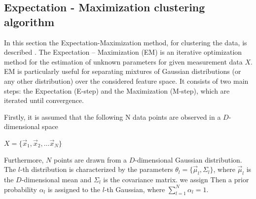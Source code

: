 \documentclass[11pt]{article}
\begin{document}
\subsection{Expectation - Maximization clustering algorithm}
In this section the Expectation-Maximization  method, for clustering the data, is described \cite{sundberg1974maximum,dempster1977maximum}. 
The Expectation – Maximization (EM) is an iterative optimization method for the estimation of unknown parameters for given measurement data $X$. EM is particularly useful for separating mixtures of Gaussian distributions (or any other distribution) over the considered feature space. It consists of two main steps: the Expectation (E-step) and the Maximization (M-step), which are iterated until convergence. 

Firstly, it is assumed that the following N data points are observed in a $D$-dimensional space 

$X=\{\overrightarrow{x}_1,\overrightarrow{x}_2,\dots \overrightarrow{x}_N\}$

Furthermore, $N$ points are drawn from a $D$-dimensional Gaussian distribution. The $l$-th distribution is characterized by the parameters $\theta_l=\{\overrightarrow{\mu}_l,\Sigma_l\}$, where $\overrightarrow{\mu}_l$ is the $D$-dimensional mean and $\Sigma_l$ is the covariance matrix. we  assign Then a prior probability $\alpha_l$ is assigned to the $l$-th Gaussian, where $\sum_{l=1}^N \alpha_l=1$.
\end{document}

